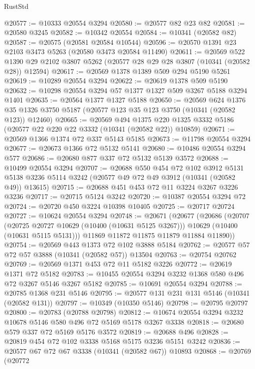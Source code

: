 \begin{lexlean}{RustStd}
\begin{coremodule}
{\begin{coremodule}
{{{{{{{{{{{{{{{{{{{{{{{{{@20577 := @10333 @20554 @3294
@20580 := @20577 @82 @23 @82
@20581 := @20580 @3245
@20582 := @10342 @20554
@20584 := @10341 (@20582 @82)
@20587 := @20575 (@20581 @20584 @10544)
@20596 := @20570 @1391 @23 @2103 @3473 @5263 (@20580 @3473 @20584 @11490)
@20611 := @20569
    @522
    @1390
    @29
    @2102
    @3807
    @5262
    (@20577 @28 @29 @28 @3807 (@10341 (@20582 @28)) @12594)
@20617 := @20569 @1378 @1389 @509 @294 @5190 @5261
@20619 := @10289 @20554 @3294
@20622 := @20619 @1378 @509 @5190
@20632 := @10298 @20554 @3294 @57 @1377 @1327 @509 @3267 @5188 @3294 @1401
@20635 := @20564 @1377 @1327 @5188
@20650 := @20569
    @624
    @1376
    @35
    @1326
    @3750
    @5187
    (@20577 @123 @35 @123 @3750 (@10341 (@20582 @123)) @12460)
@20665 := @20569
    @494
    @1375
    @220
    @1325
    @3332
    @5186
    (@20577 @22 @220 @22 @3332 (@10341 (@20582 @22)) @10859)
@20671 := @20569 @1366 @1374 @72 @337 @5143 @5185
@20673 := @11798 @20554 @3294
@20677 := @20673 @1366 @72 @5132 @5141
@20680 := @10486 @20554 @3294 @577
@20686 := @20680 @877 @337 @72 @5132 @5139 @3572
@20688 := @10499 @20554 @3294
@20707 := @20688
    @550
    @454
    @72
    @102
    @3912
    @5131
    @5138
    @3236
    @5114
    @3242
    (@20577 @49 @72 @49 @3912 (@10341 (@20582 @49)) @13615)
@20715 := @20688 @451 @453 @72 @11 @3224 @3267 @3226 @3236
@20717 := @20715 @5124 @3242
@20720 := @10387 @20554 @3294 @72
@20724 := @20720 @450 @3224 @10398 @10405
@20725 := @20717 @20724
@20727 := @10624 @20554 @3294
@20748 := @20671
    (@20677
      (@20686
        (@20707
          (@20725 @20727 @10629 (@10400 (@10631 @5125 @3267)))
          @10629
          (@10400 (@10631 @5115 @5131)))
        @11869
        @11872
        @11875
        @11879
        @11884
        @11890))
@20754 := @20569 @443 @1373 @72 @102 @3888 @5184
@20762 := @20577 @57 @72 @57 @3888 (@10341 (@20582 @57)) @13504
@20763 := @20754 @20762
@20769 := @20569 @1371 @453 @72 @11 @5182 @3226
@20772 := @20619 @1371 @72 @5182
@20783 := @10455 @20554 @3294 @3232 @1368 @580 @496 @72 @3267 @5146 @3267 @5182
@20785 := @10691 @20554 @3294
@20788 := @20785 @1368 @231 @5146
@20795 := @20577 @131 @231 @131 @5146 (@10341 (@20582 @131))
@20797 := @10349 (@10350 @5146)
@20798 := @20795 @20797
@20800 := @20783 (@20788 @20798)
@20812 := @10674 @20554 @3294 @3232 @10678 @5146 @580 @496 @72 @5169 @5178 @3267 @3338
@20818 := @20680 @579 @337 @72 @5169 @5176 @3572
@20819 := @20688 @496
@20828 := @20819 @454 @72 @102 @3338 @5168 @5175 @3236 @5151 @3242
@20836 := @20577 @67 @72 @67 @3338 (@10341 (@20582 @67)) @10893
@20868 := @20769
    (@20772
}}}}}}}}}}}}}}}}}}}}}}}}}
\end{coremodule}}
\end{coremodule}
\end{lexlean}
